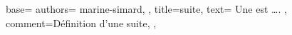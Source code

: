 {
  base={
    authors={
      marine-simard,
    },
    title=suite,
    text={
      Une  est ….
    },
    comment={Définition d'une suite},
  },
}
